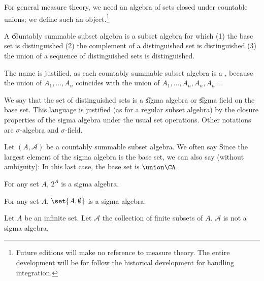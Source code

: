 

For general measure theory,
we need an algebra of sets
closed under countable unions;
we define such an object.\footnote{Future editions will make no reference to measure theory. The entire development will be for follow the historical development for handling integration.}


A \t{countably summable subset algebra}
is a subset algebra for which
(1) the base set is distinguished
(2) the complement of a distinguished
set is distinguished
(3) the union of a sequence of distinguished sets
is distinguished.

The name is justified, as
each countably summable subset algebra is a
,
because the union of $A_1, \dots, A_n$
coincides with the union of
$A_1, \dots, A_n, A_n, A_n \dots$.

We say that the set of distinguished sets is a \t{sigma algebra} or \t{sigma field} on the base set.
This language is justified (as for a regular subset algebra) by the closure properties of the sigma algebra under the usual set operations.
Other notations are $\sigma$-algebra and $\sigma$-field.


Let $(A, \mathcal{A})$ be a countably summable subset algebra.
We often say 
Since the largest element of the sigma algebra is the base set, we can also say (without ambiguity): 
In this last case, the base set is $\union \CA$.


\begin{expl}
  For any set $A$, $2^{A}$ is a sigma algebra.
\end{expl}

\begin{expl}
  For any set $A$,
  $\set{A, \emptyset}$ is a sigma algebra.
\end{expl}

\begin{expl}
  Let $A$ be an infinite set.
  Let $\mathcal{A}$ the collection
  of finite subsets of $A$.
  $\mathcal{A}$ is not a sigma algebra.
\end{expl}

